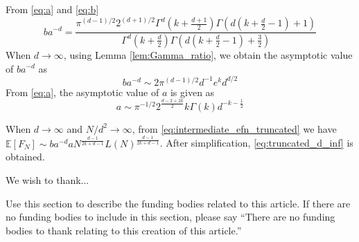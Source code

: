 \documentclass{aptpub}
\def\E{\mathbb{E}}
\begin{document}
From \eqref{eq:a} and \eqref{eq:b}
\begin{equation}
     ba^{-d}
     = \frac{\pi^{(d-1)/2} 2^{(d+1)/2}
     \Gamma^d(k+\frac{d+1}{2})
     \Gamma(d(k+\frac{d}{2}-1)+1)}{\Gamma^d(k+\frac{d}{2})\Gamma(d(k+\frac{d}{2}-1)+ \frac{3}{2})}
 \end{equation}
 When $d\to \infty$, using Lemma \ref{lem:Gamma_ratio},
 we obtain the asymptotic value of $ba^{-d}$ as
 \begin{equation}
     ba^{-d} \sim 2\pi^{(d-1)/2}
     d^{-1}e^kd^{d/2}
 \end{equation}
 From \eqref{eq:a}, the asymptotic value of $a$ is given as
 \begin{equation}
     a \sim \pi^{-1/2} 2^{\frac{d-2+2k}{2}} k \Gamma(k) d^{-k-\frac{1}{2}}
 \end{equation}

When $d\to \infty$ and $N/d^2\to \infty$,
from \eqref{eq:intermediate_efn_truncated}
we have $\E[F_N] \sim ba^{-d} a N^{\frac{d-1}{2k+d-1}}
L(N)
^{\frac{d-1}{2k+d-1}}$.
After simplification,
\eqref{eq:truncated_d_inf} is obtained.
 



\acks %
\noindent We wish to thank...



\fund %
\noindent Use this section to describe the funding bodies related to this article. If there are no funding bodies to include in this section, please say ``There are no funding bodies to thank relating to this creation of this article.''
\end{document}

